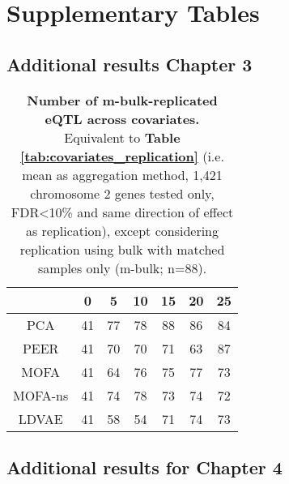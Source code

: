 \chapter{Supplementary Tables} 

\section{Additional results Chapter 3}

\begin{table}[h]
    \centering
    \begin{tabular}{c|c c c c c c}
    &          0 & 5 & 10 & 15 & 20 & 25  \\
    \hline
    PCA      & 41 & 77 & 78 & 88 & 86 & 84 \\
    PEER     & 41 & 70 & 70 & 71 & 63 & 87 \\
    MOFA     & 41 & 64 & 76 & 75 & 77 & 73 \\
    MOFA-ns  & 41 & 74 & 78 & 73 & 74 & 72 \\
    LDVAE    & 41 & 58 & 54 & 71 & 74 & 73 \\
    \end{tabular}
    \caption[Covariate comparison in terms of replication of matched bulk results]{\textbf{Number of m-bulk-replicated eQTL across covariates.} \\
    Equivalent to \textbf{Table \ref{tab:covariates_replication}} (i.e. mean as aggregation method, 1,421 chromosome 2 genes tested only, FDR<10\% and same direction of effect as replication), except considering replication using bulk with matched samples only (m-bulk; n=88).}
    \label{tab:covariates_replication_matched_bulk}
\end{table}

\newpage

\section{Additional results for Chapter 4}

